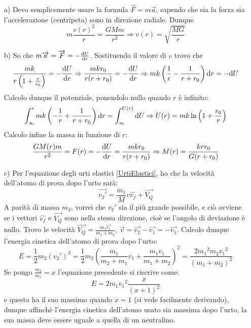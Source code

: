 \documentclass[../main.tex]{subfiles}
\begin{document}
\solution
\begin{itemize}
\item[a)] Devo semplicemente usare la formula $\overrightarrow F = m\overrightarrow a$, sapendo che sia la forza sia l'accelerazione (centripeta) sono in direzione radiale. Dunque
\begin{equation}
 m\frac{v(r)^2}{r} = \frac{GMm}{r^2} \Rightarrow v(r) = \sqrt{\frac{MG}{r}}
\end{equation}
\item[b)] So che $m\overrightarrow a = \overrightarrow F = -\frac{\mathrm{d} U}{\mathrm{d} r}$. Sostituendo il valore di $v$ trovo che
\begin{equation}
  \frac{mk}{r\left ( 1+\frac{r}{r_0}\right )} = -\frac{\mathrm{d} U}{\mathrm{d} r} \Rightarrow 
\frac{mkr_0}{r(r+r_0)} = -\frac{\mathrm{d} U}{\mathrm{d} r} \Rightarrow mk\left ( \frac{1}{r} - \frac{1}{r+r_0}\right ) \mathrm{d} r = -\mathrm{d} U
\end{equation}
Calcolo dunque il potenziale, ponendolo nullo quando $r$ è infinito:
\begin{equation}
 \int_{\infty}^{r} mk\left ( -\frac{1}{r} + \frac{1}{r+r_0}\right ) \mathrm{d} r = \int_{\infty}^{U(r)} \mathrm{d} U \Rightarrow
 U(r) = mk \ln \left ( 1 + \frac{r_0}{r}\right )
\end{equation}
Calcolo infine la massa in funzione di $r$: 
\begin{equation}
 \frac{GM(r)m}{r^2} = F(r) = -\frac{\mathrm{d} U}{\mathrm{d} r} = \frac{mkr_0}{r(r+r_0)} \Rightarrow 
 M(r) = \frac{krr_0}{G(r+r_0)}
\end{equation}
\item[c)] Per l'equazione degli urti elastici \cref{UrtiElastici}, ho che la velocità dell'atomo di prova dopo l'urto sarà:
\begin{equation*}
 \overrightarrow {{v_2}'} = \frac{m_1}{M}v\hat{v_f}+\overrightarrow {V_Q}
\end{equation*}
A parità di massa $m_2$, vorrei che ${v_2}'$ sia il più grande possibile, e ciò avviene se i vettori $\hat{v_f}$ e $\overrightarrow {V_Q}$ sono nella stessa direzione, cioè se l'angolo di deviazione è nullo.
Trovo le velocità $\overrightarrow {V_Q} = \frac{m_1\overrightarrow {v_1}}{m_1+m_2}$, $\overrightarrow v = \overrightarrow {v_2}-\overrightarrow {v_1} = -\overrightarrow {v_1}$. Calcolo dunque l'energia cinetica dell'atomo di prova dopo l'urto:
$$ E = \frac{1}{2}m_2\left ( {v_2}'\right )^2 = \frac{1}{2} m_2 \left ( \frac{m_1}{m_2+m_1}v_1+\frac{m_1v_1}{m_1+m_2}\right )^2 = \frac{2{m_1}^2m_2{v_1}^2}{\left (m_1+m_2\right )^2} $$
Se pongo $\frac{m_2}{m_1} = x$ l'equazione precedente si riscrive come:
$$ E = 2m_1{v_1}^2\frac{x}{\left ( x+1\right )^2} $$ e questa ha il suo massimo quando $x = 1$ (si vede facilmente derivando), dunque affinchè l'energia cinetica dell'atomo usato sia massima dopo l'urto, la sua massa deve essere uguale a quella di un neutralino.

\end{itemize}
\end{document}

